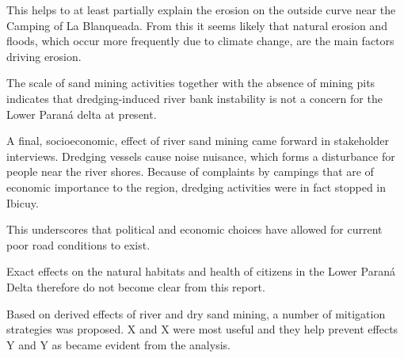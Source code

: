 


This helps to at least partially explain the erosion on the outside curve near the Camping of La Blanqueada. From this it seems likely that natural erosion and floods, which occur more frequently due to climate change, are the main factors driving erosion.

The scale of sand mining activities together with the absence of mining pits indicates that dredging-induced river bank instability is not a concern for the Lower Paraná delta at present.

 A final, socioeconomic, effect of river sand mining came forward in stakeholder interviews. Dredging vessels cause noise nuisance, which forms a disturbance for people near the river shores. Because of complaints by campings that are of economic importance to the region, dredging activities were in fact stopped in Ibicuy.


This underscores that political and economic choices have allowed for current poor road conditions to exist.

Exact effects on the natural habitats and health of citizens in the Lower Paraná Delta therefore do not become clear from this report.

Based on derived effects of river and dry sand mining, a number of mitigation strategies was proposed. X and X were most useful and they help prevent effects Y and Y as became evident from the analysis.

